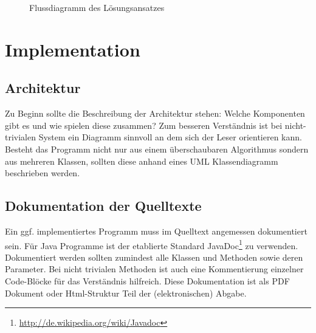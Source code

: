 \documentclass[pagesize=auto, titlepage=on]{scrartcl}
\begin{document}
\begin{figure}[tb]
  \centering
  \caption{Flussdiagramm des Lösungsansatzes}
  \label{fig:flowchart}
\end{figure}


\section{Implementation}
\label{sec:implementation}
\subsection{Architektur}
Zu Beginn sollte die Beschreibung der Architektur stehen: Welche Komponenten gibt es und wie spielen diese zusammen?
Zum besseren Verständnis ist bei nicht-trivialen System ein Diagramm sinnvoll an dem sich der Leser orientieren kann.
Besteht das Programm nicht nur aus einem überschaubaren Algorithmus sondern aus mehreren Klassen, sollten diese anhand eines UML Klassendiagramm beschrieben werden.

\subsection{Dokumentation der Quelltexte}
\label{sec:quelltextdokumentation}
Ein ggf. implementiertes Programm muss im Quelltext angemessen dokumentiert sein.
Für Java Programme ist der etablierte Standard JavaDoc\footnote{\url{http://de.wikipedia.org/wiki/Javadoc}} zu verwenden.
Dokumentiert werden sollten zumindest alle Klassen und Methoden sowie deren Parameter.
Bei nicht trivialen Methoden ist auch eine Kommentierung einzelner Code-Blöcke für das Verständnis hilfreich.
Diese Dokumentation ist als PDF Dokument oder Html-Struktur Teil der (elektronischen) Abgabe. 
\end{document}
